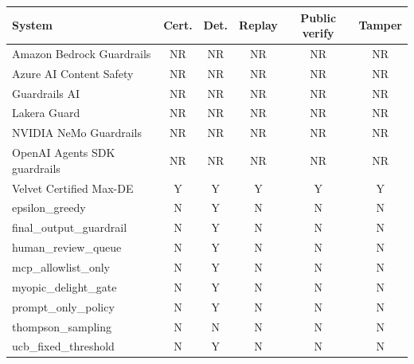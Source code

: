 \begin{tabular}{lccccc}
\toprule
System & Cert. & Det. & Replay & Public verify & Tamper \\
\midrule
Amazon Bedrock Guardrails & NR & NR & NR & NR & NR \\
Azure AI Content Safety & NR & NR & NR & NR & NR \\
Guardrails AI & NR & NR & NR & NR & NR \\
Lakera Guard & NR & NR & NR & NR & NR \\
NVIDIA NeMo Guardrails & NR & NR & NR & NR & NR \\
OpenAI Agents SDK guardrails & NR & NR & NR & NR & NR \\
Velvet Certified Max-DE & Y & Y & Y & Y & Y \\
epsilon\_greedy & N & Y & N & N & N \\
final\_output\_guardrail & N & Y & N & N & N \\
human\_review\_queue & N & Y & N & N & N \\
mcp\_allowlist\_only & N & Y & N & N & N \\
myopic\_delight\_gate & N & Y & N & N & N \\
prompt\_only\_policy & N & Y & N & N & N \\
thompson\_sampling & N & N & N & N & N \\
ucb\_fixed\_threshold & N & Y & N & N & N \\
\bottomrule
\end{tabular}
